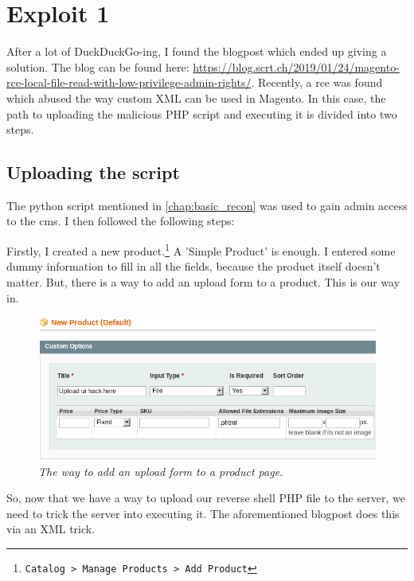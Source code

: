 \chapter{Exploit 1}
\label{chap:exploit1}

After a lot of DuckDuckGo-ing, I found the blogpost which ended up giving a solution. The blog can be found here: \url{https://blog.scrt.ch/2019/01/24/magento-rce-local-file-read-with-low-privilege-admin-rights/}. Recently, a \gls{rce} was found which abused the way custom XML can be used in Magento. In this case, the path to uploading the malicious PHP script and executing it is divided into two steps.

\section{Uploading the script}

The python script mentioned in \cref{chap:basic_recon} was used to gain admin access to the \gls{cms}. I then followed the following steps:

\vspace{5mm}

Firstly, I created a new product.\footnote{\verb|Catalog > Manage Products > Add Product|} A 'Simple Product' is enough. I entered some dummy information to fill in all the fields, because the product itself doesn't matter. But, there is a way to add an upload form to a product. This is our way in.

\begin{figure}[H]
	\centering
	\captionsetup{justification=centering}
	\noindent \includegraphics[width=\textwidth]{figures/new-product-upload.png}
	\caption{\emph{The way to add an upload form to a product page.}}
	\label{fig:37811.py}
\end{figure}

So, now that we have a way to upload our reverse shell PHP file to the server, we need to trick the server into executing it. The aforementioned blogpost does this via an XML trick.

